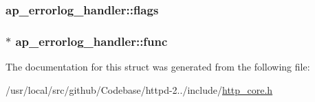 \subsubsection[{\texorpdfstring{flags}{flags}}]{ ap\+\_\+errorlog\+\_\+handler\+::flags}\hypertarget{structap__errorlog__handler_aebc80b5baa533af896473199c1c27d9d}{}\label{structap__errorlog__handler_aebc80b5baa533af896473199c1c27d9d}
\subsubsection[{\texorpdfstring{func}{func}}]{$\ast$ ap\+\_\+errorlog\+\_\+handler\+::func}\hypertarget{structap__errorlog__handler_a48525891927bfb591289cd5ec92b8d4e}{}\label{structap__errorlog__handler_a48525891927bfb591289cd5ec92b8d4e}


The documentation for this struct was generated from the following file\+:\begin{DoxyCompactItemize}
\item 
/usr/local/src/github/\+Codebase/httpd-\/2../include/\hyperlink{http__core_8h}{http\+\_\+core.\+h}\end{DoxyCompactItemize}
